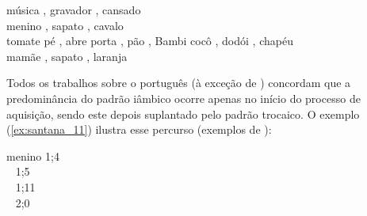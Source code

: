 \documentclass[output=paper]{LSP/langsci}
\begin{document}
\ea\label{ex:santana_7}
música \ipa{[mu.\pstr zi.ka]}, gravador ,  cansado \ipa{[k\~{a}.sa.\pstr du]}\\
\z
\ea\label{ex:santana_8}
menino \ipa{[mi\pstr ni]} , sapato \ipa{[pa\pstr pa]}, cavalo \\
tomate 
\z
\ea\label{ex:santana_9}
pé \ipa{[u\pstr pE]} \ipa{[ti\pstr pa]}, abre 
porta , pão \ipa{[5\pstr p5]}, Bambi \ipa{[5\pstr b5]}
\z
\ea\label{ex:santana_10}
cocô \ipa{[ko\pstr ko]}, dodói  , chapéu \\
mamãe \ipa{[m5.\pstr m\~{5}]}, sapato \ipa{[p5\pstr p5]}, laranja \\
\z

Todos os trabalhos sobre o português (à exceção de \citealt{rapp1994}) concordam que a predominância do padrão iâmbico ocorre apenas no início do processo de aquisição, sendo este depois suplantado pelo padrão trocaico. O exemplo (\ref{ex:santana_11}) ilustra esse percurso (exemplos de \citealt{santos2007}):

\ea\label{ex:santana_11}
\gllll menino {\ipa{[mi]} 1;4}\\
~ {\ipa{[me] [a\pstr mi] [mi\pstr mi]} 1;5}\\
~ {\ipa{[mi\pstr ni.nu]} 1;11}\\
~ {\ipa{[mi\pstr ni.nu] [\pstr mi.nu]} 2;0}\\
\z
\end{document}
